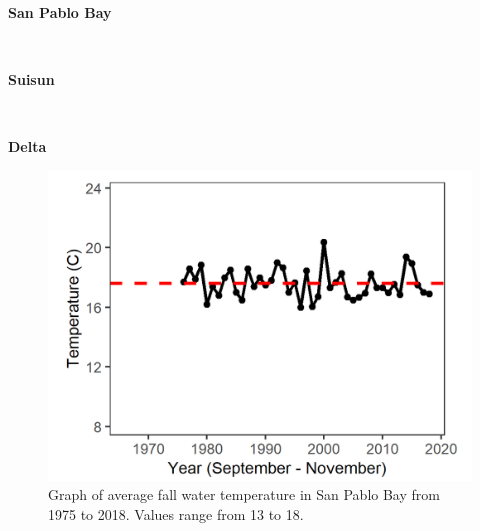 \documentclass[
]{book}
\begin{document}
\begin{panel-grid}

\begin{columns-nocenter}

\begin{column800}

\textbf{San Pablo Bay}

\end{column800}

\begin{column40}

~

\end{column40}

\begin{column800}

\textbf{Suisun}

\end{column800}

\begin{column40}

~

\end{column40}

\begin{column800}

\textbf{Delta}

\end{column800}

\end{columns-nocenter}

\begin{columns-nocenter}

\begin{column800}

\begin{expand}

\begin{figure}
\includegraphics[width=15.25in]{figures/temp_splfall} \caption{Graph of average fall water temperature in San Pablo Bay from 1975 to 2018. Values range from 13 to 18.}\label{fig:unnamed-chunk-102}
\end{figure}


\end{expand}
\end{column800}
\end{columns-nocenter}
\end{panel-grid}
\end{document}
